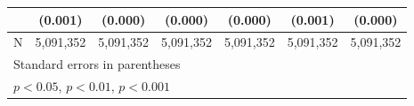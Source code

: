 {\begin{tabular}{l*{6}{c}}
                    &     (0.001)         &     (0.000)         &     (0.000)         &     (0.000)         &     (0.001)         &     (0.000)         \\
\hline
N                   &   5,091,352         &   5,091,352         &   5,091,352         &   5,091,352         &   5,091,352         &   5,091,352         \\
\hline\hline
\multicolumn{7}{l}{\footnotesize Standard errors in parentheses}\\
\multicolumn{7}{l}{\footnotesize \sym{*} \(p<0.05\), \sym{**} \(p<0.01\), \sym{***} \(p<0.001\)}\\
\end{tabular}
}
